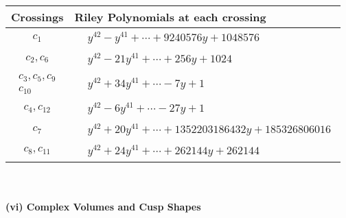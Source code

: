 \documentclass[1p]{elsarticle_modified}
\theoremstyle{definition}
\begin{document}
\begin{tabular}{m{50pt}|m{274pt}}
Crossings & \hspace{64pt}Riley Polynomials at each crossing \\
\hline $$\begin{aligned}c_{1}\end{aligned}$$&$\begin{aligned}
&y^{42}- y^{41}+\cdots+9240576 y+1048576
\end{aligned}$\\
\hline $$\begin{aligned}c_{2},c_{6}\end{aligned}$$&$\begin{aligned}
&y^{42}-21 y^{41}+\cdots+256 y+1024
\end{aligned}$\\
\hline $$\begin{aligned}c_{3},c_{5},c_{9}\\c_{10}\end{aligned}$$&$\begin{aligned}
&y^{42}+34 y^{41}+\cdots-7 y+1
\end{aligned}$\\
\hline $$\begin{aligned}c_{4},c_{12}\end{aligned}$$&$\begin{aligned}
&y^{42}-6 y^{41}+\cdots-27 y+1
\end{aligned}$\\
\hline $$\begin{aligned}c_{7}\end{aligned}$$&$\begin{aligned}
&y^{42}+20 y^{41}+\cdots+1352203186432 y+185326806016
\end{aligned}$\\
\hline $$\begin{aligned}c_{8},c_{11}\end{aligned}$$&$\begin{aligned}
&y^{42}+24 y^{41}+\cdots+262144 y+262144
\end{aligned}$\\
\hline
\end{tabular}\\~\\
\newpage\flushleft \textbf{(vi) Complex Volumes and Cusp Shapes}
\end{document}

